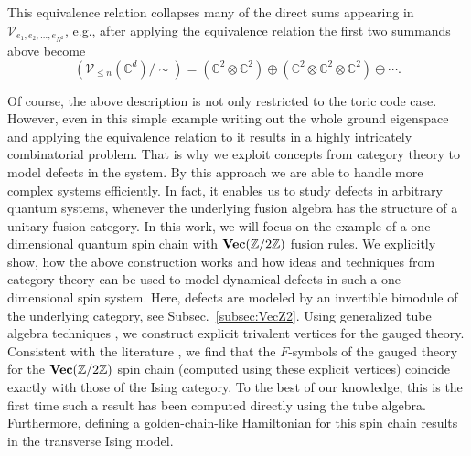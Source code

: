 This equivalence relation collapses many of the direct sums appearing in $\mathcal{V}_{e_1,e_2,\ldots,e_{N^2}}$, e.g., after applying the equivalence relation the first two summands above become
\begin{equation}
\left(\mathcal{V}_{\le n}(\mathbb{C}^d)/\sim\right) = (\mathbb{C}^2\otimes \mathbb{C}^2)\oplus (\mathbb{C}^2\otimes \mathbb{C}^2\otimes \mathbb{C}^2)\oplus \cdots.
\end{equation}

Of course, the above description is not only restricted to the toric code case. However, even in this simple example writing out the whole ground eigenspace and applying the equivalence relation to it results in a highly intricately combinatorial problem. That is why we exploit concepts from category theory to model defects in the system. By this approach we are able to handle more complex systems efficiently. In fact, it enables us to study defects in arbitrary quantum systems, whenever the underlying fusion algebra has the structure of a unitary fusion category. In this work, we will focus on the example of a one-dimensional quantum spin chain with $\textbf{Vec}(\mathbb{Z}/2\mathbb{Z})$ fusion rules. We explicitly show, how the above construction works and how ideas and techniques from category theory can be used to model dynamical defects in such a one-dimensional spin system. Here, defects are modeled by an invertible bimodule of the underlying category, see Subsec.~\ref{subsec:VecZ2}. Using generalized tube algebra techniques \cite{ocneanu}, we construct explicit trivalent vertices for the gauged theory. Consistent with the literature \cite{TY,ENO10,Bombin2010,BBCW14,WBV17}, we find that the $F$-symbols of the gauged theory for the $\textbf{Vec}(\mathbb{Z}/2\mathbb{Z})$ spin chain (computed using these explicit vertices) coincide exactly with those of the Ising category. To the best of our knowledge, this is the first time such a result has been computed directly using the tube algebra. Furthermore, defining a golden-chain-like Hamiltonian \cite{Feiguin2007} for this spin chain results in the transverse Ising model.

